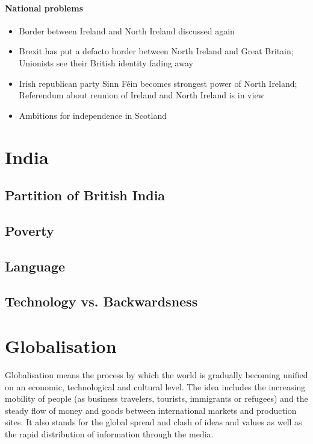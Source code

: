 \documentclass[10pt]{article}
\begin{document}
\paragraph{National problems}\label{par:uk/brexit/natproblems}
\begin{itemize}
\item Border between Ireland and North Ireland discussed again 
\item Brexit has put a defacto border between North Ireland and Great Britain; Unionists  see their British identity fading away
\item Irish republican party Sinn Féin becomes strongest power of North Ireland; Referendum about reunion of Ireland and North Ireland is in view
\item Ambitions for independence in Scotland 
\end{itemize}

\section{India}
	\label{sec:india}
\subsection{Partition of British India}
	\label{sec:india/britindia}
\subsection{Poverty}
	\label{sec:india/poverty}
\subsection{Language}
	\label{sec:india/language}
\subsection{Technology vs. Backwardsness}
	\label{sec:india/tech}
\newpage
\section{Globalisation}
	\label{sec:global}
\begin{definition}
Globalisation means the process by which the world is gradually becoming unified
on an economic, technological and cultural level. The idea includes the increasing
mobility of people (as business travelers, tourists, immigrants or refugees) and the
steady flow of money and goods between international markets and production sites.
It also stands for the global spread and clash of ideas and values as well as the rapid
distribution of information through the media.
\end{definition}
\end{document}
